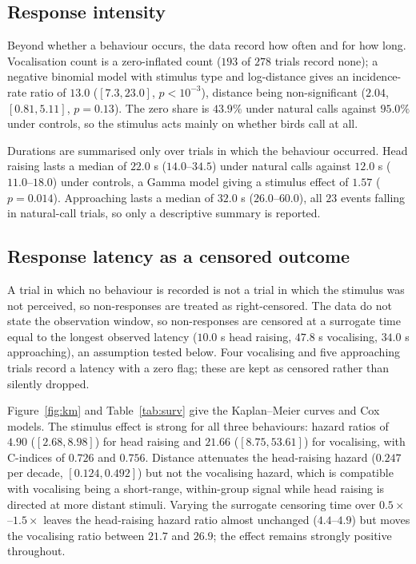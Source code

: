 \documentclass{apmcmthesis}
\begin{document}
\subsection{Response intensity}

Beyond whether a behaviour occurs, the data record how often and for how long.
Vocalisation count is a zero-inflated count ($193$ of $278$ trials record none); a
negative binomial model with stimulus type and log-distance gives an incidence-rate ratio
of $13.0$ ($[7.3,23.0]$, $p<10^{-3}$), distance being non-significant ($2.04$,
$[0.81,5.11]$, $p=0.13$). The zero share is $43.9\%$ under natural calls against $95.0\%$
under controls, so the stimulus acts mainly on whether birds call at all.

Durations are summarised only over trials in which the behaviour occurred. Head raising
lasts a median of $22.0$ s ($14.0$--$34.5$) under natural calls against $12.0$ s
($11.0$--$18.0$) under controls, a Gamma model giving a stimulus effect of $1.57$
($p=0.014$). Approaching lasts a median of $32.0$ s ($26.0$--$60.0$), all $23$ events
falling in natural-call trials, so only a descriptive summary is reported.

\subsection{Response latency as a censored outcome}

A trial in which no behaviour is recorded is not a trial in which the stimulus was not
perceived, so non-responses are treated as right-censored. The data do not state the
observation window, so non-responses are censored at a surrogate time equal to the longest
observed latency ($10.0$ s head raising, $47.8$ s vocalising, $34.0$ s approaching), an
assumption tested below. Four vocalising and five approaching trials record a latency with
a zero flag; these are kept as censored rather than silently dropped.

Figure~\ref{fig:km} and Table~\ref{tab:surv} give the Kaplan--Meier\cite{km} curves and Cox\cite{cox} models.
The stimulus effect is strong for all three behaviours: hazard ratios of $4.90$
($[2.68,8.98]$) for head raising and $21.66$ ($[8.75,53.61]$) for vocalising, with
C-indices of $0.726$ and $0.756$. Distance attenuates the head-raising hazard
($0.247$ per decade, $[0.124,0.492]$) but not the vocalising hazard, which is compatible
with vocalising being a short-range, within-group signal while head raising is directed at
more distant stimuli. Varying the surrogate censoring time over $0.5\times$--$1.5\times$
leaves the head-raising hazard ratio almost unchanged ($4.4$--$4.9$) but moves the
vocalising ratio between $21.7$ and $26.9$; the effect remains strongly positive throughout.
\end{document}
